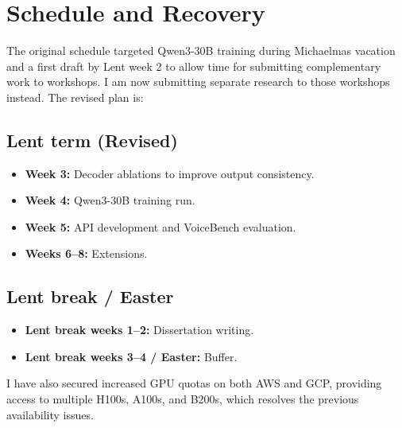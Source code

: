 \documentclass[11pt,a4paper]{scrartcl}
\begin{document}
\section{Schedule and Recovery}

The original schedule targeted Qwen3-30B training during Michaelmas vacation and a first draft by Lent week 2 to allow time for submitting complementary work to workshops. I am now submitting separate research to those workshops instead. The revised plan is:

\subsection*{Lent term (Revised)}
\begin{itemize}
  \item \textbf{Week 3:} Decoder ablations to improve output consistency.
  \item \textbf{Week 4:} Qwen3-30B training run.
  \item \textbf{Week 5:} API development and VoiceBench evaluation.
  \item \textbf{Weeks 6--8:} Extensions.
\end{itemize}

\subsection*{Lent break / Easter}
\begin{itemize}
  \item \textbf{Lent break weeks 1--2:} Dissertation writing.
  \item \textbf{Lent break weeks 3--4 / Easter:} Buffer.
\end{itemize}

I have also secured increased GPU quotas on both AWS and GCP, providing access to multiple H100s, A100s, and B200s, which resolves the previous availability issues.
\end{document}

